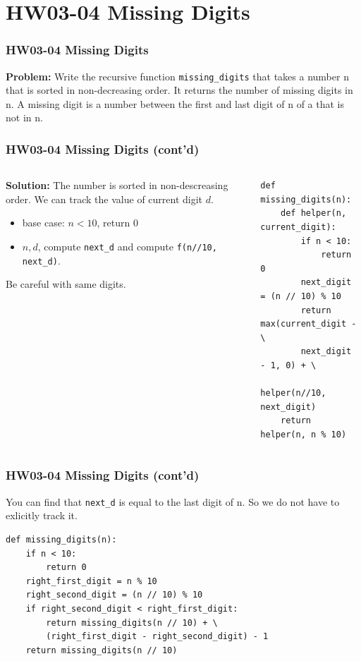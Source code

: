 \documentclass[aspectratio=169]{beamer}
\begin{document}
\section{HW03-04 Missing Digits}
\begin{frame}[fragile]
\frametitle{HW03-04 Missing Digits}
\textbf{Problem:} Write the recursive function \texttt{missing_digits} that takes a number n that is sorted in non-decreasing order. It returns the number of missing digits in n. A missing digit is a number between the first and last digit of n of a that is not in n.

\end{frame} 

\begin{frame}[fragile]
\frametitle{HW03-04 Missing Digits (cont'd)}

\begin{columns}
\begin{column}{0.4\textwidth}
\textbf{Solution:} 
The number is sorted in non-descreasing order. We can track the value of current digit $d$.
\begin{itemize}
    \item base case: $n < 10$, return 0
    \item $n, d$, compute \texttt{next_d} and compute \texttt{f(n//10, next_d)}.
\end{itemize}

Be careful with same digits.

\end{column}

\begin{column}{0.6\textwidth}  
\begin{verbatim}
def missing_digits(n):
    def helper(n, current_digit):
        if n < 10:
            return 0
        next_digit = (n // 10) % 10
        return max(current_digit - \
        next_digit - 1, 0) + \
        helper(n//10, next_digit)
    return helper(n, n % 10)
\end{verbatim}
\end{column}
\end{columns}

\end{frame}


\begin{frame}[fragile]
\frametitle{HW03-04 Missing Digits (cont'd)}

You can find that \texttt{next_d} is equal to the last digit of n. So we do not have to exlicitly track it.
\begin{verbatim}
def missing_digits(n):
    if n < 10:
        return 0
    right_first_digit = n % 10
    right_second_digit = (n // 10) % 10
    if right_second_digit < right_first_digit:
        return missing_digits(n // 10) + \
        (right_first_digit - right_second_digit) - 1
    return missing_digits(n // 10)
\end{verbatim}
\end{frame}
\end{document}
